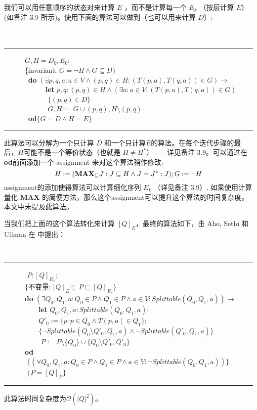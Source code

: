 我们可以用任意顺序的状态对来计算 $E$ ，而不是计算每一个 $E_k$ （按层计算 $E$）(如备注 3.9 所示)。使用下面的算法可以做到（也可以用来计算 $D$）:
\\
\\
\\
\rule{\textwidth}{1pt}
\mbox{　　　}$G,H=D_0,E_0$;\\
\mbox{　　　\{invariant:} $G= \neg H \land G \subseteq D \}$\\
\mbox{　　　 \textbf{do}} $ ( \exists p,q,a : a \in V \land (p,q) \in H : ( T(p,a) , T(q,a) ) \in G  ) \longrightarrow $ \\
\mbox{　　　　　　\textbf{let}} $ p,q :(p,q) \in H \land ( \exists a : a \in V :  ( T(p,a) , T(q,a) ) \in G   ) $ \\
\mbox{　　　　　　} $ \{  (p,q) \in D \}  $ \\
\mbox{　　　　　　} $ G,H:= G \cup {(p,q)},H \setminus {(p,q) } $ \\
\mbox{　　　 \textbf{od}}$ \{ G=D \land H=E \}$ \\
\rule{\textwidth}{1pt}
此算法可以分解为一个只计算 $D$ 和一个只计算$E$的算法。在每个迭代步骤的最后，$H$可能不是一个等价状态（也就是 $ H \not= H^* $）——详见备注 3.9。可以通过在\textbf{od}前面添加一个 assignment 来对这个算法稍作修改:
$$ H := (\mbox{\textbf{MAX}}_{\subseteq } J : J \subseteq H \land J = J ^* : J); G := \neg H $$
assignment的添加使得算法可以计算细化序列 $E_k$ （详见备注 3.9）. 如果使用计算量化 \textbf{MAX} 的简便方法，那么这个assignment可以提升这个算法的时间复杂度。本文中未提及此算法。

当我们把上面的这个算法转化来计算 $[Q]_E$，最终的算法如下，由 Aho, Sethi 和 Ullman 在 \cite[Alg.3.6]{ASU86} 中提出：
\newline

\\
\rule{\textwidth}{1pt}
\mbox{　　　} $P:[Q]_{E_0};$ \\
\mbox{　　　}$\{ \mbox{不变量:} [Q]_E \sqsubseteq P \sqsubseteq [Q]_{E_0} \}$ \\
\mbox{　　　\textbf{do}} $(\exists Q_0,Q_1,a : Q_0 \in P \land Q_1 \in P \land a \in V : Splittable (Q_0,Q_1,a)) \longrightarrow$ \\
\mbox{　　　　　\textbf{let}} $Q_0,Q_1,a:Splittable(Q_0,Q_1,a);$ \\
\mbox{　　　　　}$Q'_0 := \{ p:p\in Q_0 \land T(p,a) \in Q_1 \};$ \\
\mbox{　　　　　}$\{ \neg Splittable (Q_0 \setminus Q'_0 ,Q_1 ,a ) \land \neg Splittable (Q'_0,Q_1,a) \}$ \\
\mbox{　　　　　} $P := P \setminus \{Q_0\} \cup \{Q_0 \setminus Q'_0,Q'_0 \}$ \\
\mbox{　　　\textbf{od}}\\
\mbox{　　　} $ \{ (\forall Q_0,Q_1,a : Q_0 \in P \land Q_1 \in P \land a \in V : \neg Splittable (Q_0,Q_1,a))  \} $ \\
\mbox{　　　} $\{  P = [Q]_E \}$ \\
\rule{\textwidth}{1pt}
此算法时间复杂度为$\mathcal{O}(|Q|^2)$。

